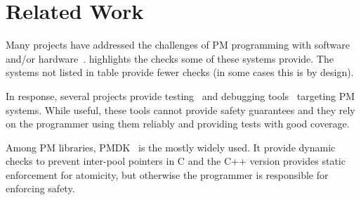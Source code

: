 \section{Related Work}
\label{sec:related}



Many projects have addressed the challenges of PM programming with
software~\cite{pmdk,pronto,mnemosyne,nvheaps,atlas,oracle-nvm-direct,ido,usnap,cohen2018object,
  autopersist,janus,libpm,lazypersist,pisces} and/or
hardware~\cite{ogleari2018steal,Kiln,jeong2018efficient,xu2020hardware}.
 highlights the checks some of these systems provide.  The systems not listed in table
provide fewer checks (in some cases this is by design).

In response, several projects provide
testing~\cite{pmtest,oukid2016testing,xfdetector} and debugging
tools~\cite{intel-pmemcheck,intel-inspector,lantz2014yat} targeting PM systems.
While useful, these tools cannot provide safety guarantees and they rely on the
programmer using them reliably and providing tests with good coverage.

Among PM libraries, PMDK~\cite{pmdk} is the mostly widely used.  It provide dynamic checks to prevent inter-pool pointers in C and the C++ version provides static enforcement for atomicity, but otherwise the programmer is responsible for enforcing safety.

